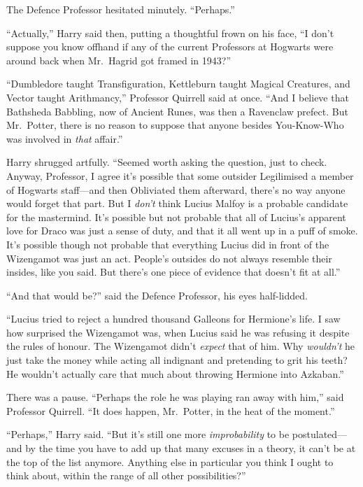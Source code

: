 The Defence Professor hesitated minutely. ``Perhaps.''

``Actually,'' Harry said then, putting a thoughtful frown on his face,
``I don't suppose you know offhand if any of the current Professors at
Hogwarts were around back when Mr.~Hagrid got framed in 1943?''

``Dumbledore taught Transfiguration, Kettleburn taught Magical
Creatures, and Vector taught Arithmancy,'' Professor Quirrell said at
once. ``And I believe that Bathsheda Babbling, now of Ancient Runes, was
then a Ravenclaw prefect. But Mr.~Potter, there is no reason to suppose
that anyone besides You-Know-Who was involved in \emph{that} affair.''

Harry shrugged artfully. ``Seemed worth asking the question, just to
check. Anyway, Professor, I agree it's possible that some outsider
Legilimised a member of Hogwarts staff---and then Obliviated them
afterward, there's no way anyone would forget that part. But I
\emph{don't} think Lucius Malfoy is a probable candidate for the
mastermind. It's possible but not probable that all of Lucius's apparent
love for Draco was just a sense of duty, and that it all went up in a
puff of smoke. It's possible though not probable that everything Lucius
did in front of the Wizengamot was just an act. People's outsides do not
always resemble their insides, like you said. But there's one piece of
evidence that doesn't fit at all.''

``And that would be?'' said the Defence Professor, his eyes half-lidded.

``Lucius tried to reject a hundred thousand Galleons for Hermione's
life. I saw how surprised the Wizengamot was, when Lucius said he was
refusing it despite the rules of honour. The Wizengamot didn't
\emph{expect} that of him. Why \emph{wouldn't} he just take the money
while acting all indignant and pretending to grit his teeth? He wouldn't
actually care that much about throwing Hermione into Azkaban.''

There was a pause. ``Perhaps the role he was playing ran away with
him,'' said Professor Quirrell. ``It does happen, Mr.~Potter, in the
heat of the moment.''

``Perhaps,'' Harry said. ``But it's still one more \emph{improbability}
to be postulated---and by the time you have to add up that many excuses
in a theory, it can't be at the top of the list anymore. Anything else
in particular you think I ought to think about, within the range of all
other possibilities?''

